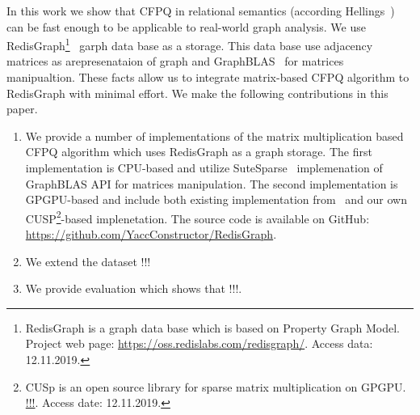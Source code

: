 

In this work we show that CFPQ in relational semantics (according Hellings~\cite{hellingsRelational}) can be fast enough to be applicable to real-world graph analysis.
We use RedisGraph\footnote{RedisGraph is a graph data base which is based on Property Graph Model. Project web page: \url{https://oss.redislabs.com/redisgraph/}. Access data: 12.11.2019.}~\cite{8778293} garph data base as a storage.
This data base use adjacency matrices as arepresenataion of graph and GraphBLAS~\cite{7761646} for matrices manipualtion. 
These facts allow us to integrate matrix-based CFPQ algorithm to RedisGraph with minimal effort.
We make the following contributions in this paper.
\begin{enumerate}
\item We provide a number of implementations of the matrix multiplication based CFPQ algorithm which uses RedisGraph as a graph storage.
The first implementation is CPU-based and utilize SuteSparse~\cite{!!!} implemenation of GraphBLAS API for matrices manipulation.
The second implementation is GPGPU-based and include both existing implementation from~\cite{!!!} and our own CUSP\footnote{CUSp is an open source library for sparse matrix multiplication on GPGPU. \url{!!!}. Access date: 12.11.2019.}-based implenetation.
The source code is available on GitHub: \url{https://github.com/YaccConstructor/RedisGraph}.
\item We extend the dataset !!!
\item We provide evaluation which shows that !!!.
\end{enumerate}
